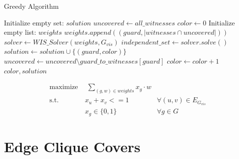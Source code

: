 \begin{algorithm}
\caption{Greedy Algorithm}\label{alg:greedy}
\begin{algorithmic}[1]
\State Initialize empty set: $solution$
\State $uncovered\gets all\_witnesses$
\State $color\gets 0$
    \State Initialize empty list: $weights$
        \State $weights.append((guard, |witnesses\cap uncovered|))$
    \EndFor
    \State $solver\gets WIS\_Solver(weights, G_{vis})$
    \State $independent\_set\gets solver.solve()$
        \State $solution\gets solution\cup \{(guard, color)\}$
        \State $uncovered\gets uncovered\setminus guard\_to\_witnesses[guard]$
    \EndFor 
    \State $color\gets color + 1$
\EndWhile
\Return $color, solution$
\EndProcedure
\end{algorithmic}
\end{algorithm}

\begin{align}
\label{eq_MIP:f.0} \mbox{maximize}~& \;\sum_{(g, w)\in weights} x_{g}\cdot w& \\
\label{eq_MIP:f.1} \mbox{s.t. } &x_{u} + x_{v} <= 1 & \forall (u,v) \in E_{G_{vis}}\\
\label{eq_MIP:f.6}& x_{g} \in \{0,1\} & \forall g\in G
\end{align}

\section{Edge Clique Covers}

